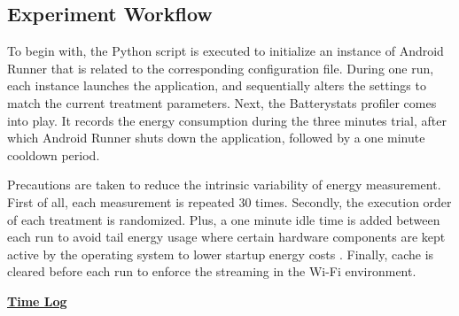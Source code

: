 \subsection{Experiment Workflow}
To begin with, the Python script is executed to initialize an instance of Android Runner that is related to the corresponding configuration file. During one run, each instance launches the application, and sequentially alters the settings to match the current treatment parameters. Next, the Batterystats profiler comes into play. It records the energy consumption during the three minutes trial, after which Android Runner shuts down the application, followed by a one minute cooldown period. 

Precautions are taken to reduce the intrinsic variability of energy measurement. First of all, each measurement is repeated 30 times. Secondly, the execution order of each treatment is randomized. Plus, a one minute idle time is added between each run to avoid tail energy usage where certain hardware components are kept active by the operating system to lower startup energy costs \cite{li2013calculating}. Finally, cache is cleared before each run to enforce the streaming in the Wi-Fi environment. 

\href{https://docs.google.com/spreadsheets/d/1w2QG47_3Y9-IXbPPSM2fw1bH0ZvWMfadzRdfwqmWBtI/edit?usp=sharing}{\textbf{Time Log}}